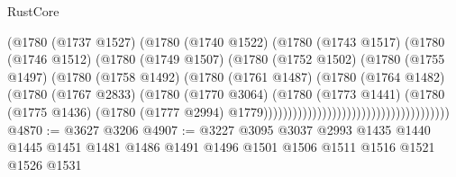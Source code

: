\begin{lexlean}{RustCore}
\begin{coremodule}
                                                  (@1780
                                                    (@1737 @1527)
                                                    (@1780
                                                      (@1740 @1522)
                                                      (@1780
                                                        (@1743 @1517)
                                                        (@1780
                                                          (@1746 @1512)
                                                          (@1780
                                                            (@1749 @1507)
                                                            (@1780
                                                              (@1752 @1502)
                                                              (@1780
                                                                (@1755 @1497)
                                                                (@1780
                                                                  (@1758 @1492)
                                                                  (@1780
                                                                    (@1761 @1487)
                                                                    (@1780
                                                                      (@1764 @1482)
                                                                      (@1780
                                                                        (@1767 @2833)
                                                                        (@1780
                                                                          (@1770 @3064)
                                                                          (@1780
                                                                            (@1773 @1441)
                                                                            (@1780
                                                                              (@1775 @1436)
                                                                              (@1780
                                                                                (@1777 @2994)
                                                                                @1779))))))))))))))))))))))))))))))))))))))
@4870 := @3627 @3206
@4907 := @3227
    @3095
    @3037
    @2993
    @1435
    @1440
    @1445
    @1451
    @1481
    @1486
    @1491
    @1496
    @1501
    @1506
    @1511
    @1516
    @1521
    @1526
    @1531

\end{coremodule}
\end{lexlean}
